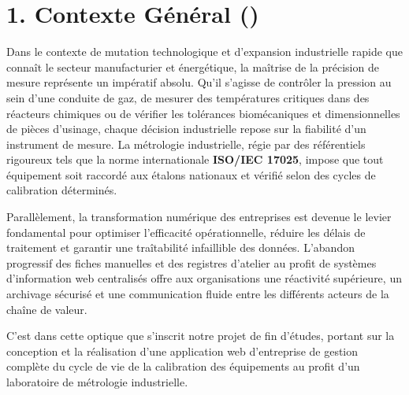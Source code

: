 \documentclass{bts-report}
\begin{document}
\section*{1. Contexte G\'en\'eral ()}
Dans le contexte de mutation technologique et d'expansion industrielle rapide que conna\^it le secteur manufacturier et \'energ\'etique, la ma\^itrise de la pr\'ecision de mesure repr\'esente un imp\'eratif absolu. Qu'il s'agisse de contr\^oler la pression au sein d'une conduite de gaz, de mesurer des temp\'eratures critiques dans des r\'eacteurs chimiques ou de v\'erifier les tol\'erances biom\'ecaniques et dimensionnelles de pi\`eces d'usinage, chaque d\'ecision industrielle repose sur la fiabilit\'e d'un instrument de mesure. La m\'etrologie industrielle, r\'egie par des r\'ef\'erentiels rigoureux tels que la norme internationale \textbf{ISO/IEC 17025}, impose que tout \'equipement soit raccord\'e aux \'etalons nationaux et v\'erifi\'e selon des cycles de calibration d\'etermin\'es.

Parall\`element, la transformation num\'erique des entreprises est devenue le levier fondamental pour optimiser l'efficacit\'e op\'erationnelle, r\'eduire les d\'elais de traitement et garantir une tra\^itabilit\'e infaillible des donn\'ees. L'abandon progressif des fiches manuelles et des registres d'atelier au profit de syst\`emes d'information web centralis\'es offre aux organisations une r\'eactivit\'e sup\'erieure, un archivage s\'ecuris\'e et une communication fluide entre les diff\'erents acteurs de la cha\^ine de valeur.

C'est dans cette optique que s'inscrit notre projet de fin d'\'etudes, portant sur la conception et la r\'ealisation d'une application web d'entreprise de gestion compl\`ete du cycle de vie de la calibration des \'equipements au profit d'un laboratoire de m\'etrologie industrielle.
\end{document}
